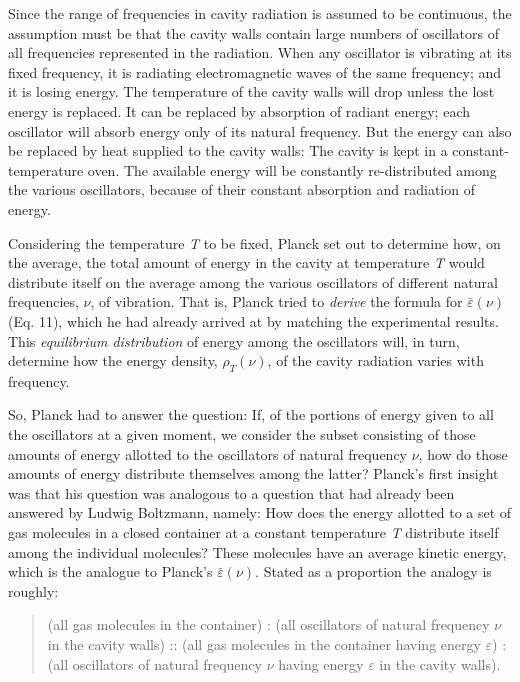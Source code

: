 Since the range of frequencies in cavity radiation is assumed to be
continuous, the assumption must be that the cavity walls contain large
numbers of oscillators of all frequencies represented in the radiation.
When any oscillator is vibrating at its fixed frequency, it is radiating
electromagnetic waves of the same frequency; and it is losing energy.
The temperature of the cavity walls will drop unless the lost energy is
replaced. It can be replaced by absorption of radiant energy; each
oscillator will absorb energy only of its natural frequency. But the
energy can also be replaced by heat supplied to the cavity walls: The
cavity is kept in a constant-temperature oven. The available energy will
be constantly re-distributed among the various oscillators, because of
their constant absorption and radiation of energy.

Considering the temperature \emph{T} to be fixed, Planck set out to
determine how, on the average, the total amount of energy in the cavity
at temperature \emph{T} would distribute itself on the average among the
various oscillators of different natural frequencies, $\nu$, of
vibration. That is, Planck tried to \emph{derive} the formula for
$\bar{\varepsilon}(\nu)$ (Eq. 11), which he had already arrived at by matching the
experimental results. This \emph{equilibrium distribution} of energy
among the oscillators will, in turn, determine how the energy density,
$\rho_T(\nu)$, of the cavity radiation varies with
frequency.

So, Planck had to answer the question: If, of the portions of energy
given to all the oscillators at a given moment, we consider the subset
consisting of those amounts of energy allotted to the oscillators of
natural frequency $\nu$, how do those amounts of energy distribute
themselves among the latter? Planck's first insight was that his
question was analogous to a question that had already been answered by
Ludwig Boltzmann, namely: How does the energy allotted to a set of gas
molecules in a closed container at a constant temperature \emph{T}
distribute itself among the individual molecules? These molecules have
an average kinetic energy, which is the analogue to Planck's $\bar{\varepsilon}(\nu)$.
Stated as a proportion the analogy is roughly:

\begin{quote}
(all gas molecules in the container) : (all oscillators of natural
frequency $\nu$ in the cavity walls) :: (all gas molecules in the
container having energy $\varepsilon$) : (all oscillators of natural
frequency $\nu$ having energy $\varepsilon$ in the cavity walls).
\end{quote}

